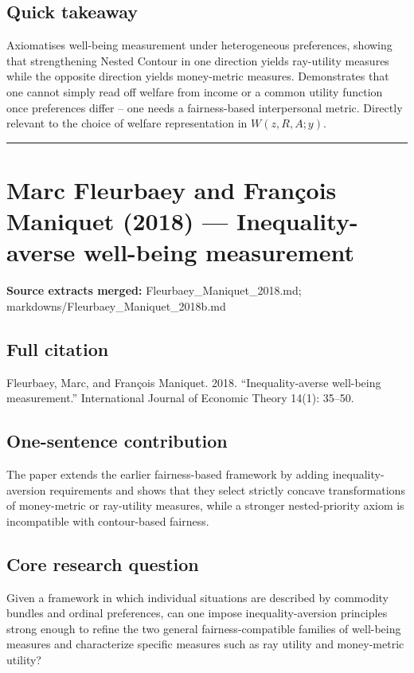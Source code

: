 \documentclass[11pt,a4paper]{article}
\begin{document}
\subsection*{Quick takeaway}
Axiomatises well-being measurement under heterogeneous preferences, showing that strengthening Nested Contour in one direction yields ray-utility measures while the opposite direction yields money-metric measures. Demonstrates that one cannot simply read off welfare from income or a common utility function once preferences differ -- one needs a fairness-based interpersonal metric. Directly relevant to the choice of welfare representation in $W(z,R,A;y)$.


\medskip\hrule\medskip

\section*{Marc Fleurbaey and François Maniquet (2018) — Inequality-averse well-being measurement}

\textbf{Source extracts merged:} Fleurbaey\_Maniquet\_2018.md; markdowns/Fleurbaey\_Maniquet\_2018b.md

\subsection*{Full citation}
Fleurbaey, Marc, and François Maniquet. 2018. “Inequality-averse well-being measurement.” International Journal of Economic Theory 14(1): 35–50.

\subsection*{One-sentence contribution}
The paper extends the earlier fairness-based framework by adding inequality-aversion requirements and shows that they select strictly concave transformations of money-metric or ray-utility measures, while a stronger nested-priority axiom is incompatible with contour-based fairness.

\subsection*{Core research question}
Given a framework in which individual situations are described by commodity bundles and ordinal preferences, can one impose inequality-aversion principles strong enough to refine the two general fairness-compatible families of well-being measures and characterize specific measures such as ray utility and money-metric utility?
\end{document}
